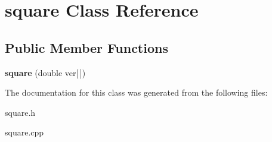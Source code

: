 \hypertarget{classsquare}{}\section{square Class Reference}
\label{classsquare}
\subsection*{Public Member Functions}
\begin{DoxyCompactItemize}
\item 
\mbox{\label{classsquare_a15254b64f3895564186ed88f63cf6304}} 
{\bfseries square} (double ver\mbox{[}$\,$\mbox{]})
\end{DoxyCompactItemize}


The documentation for this class was generated from the following files\+:\begin{DoxyCompactItemize}
\item 
square.\+h\item 
square.\+cpp\end{DoxyCompactItemize}
